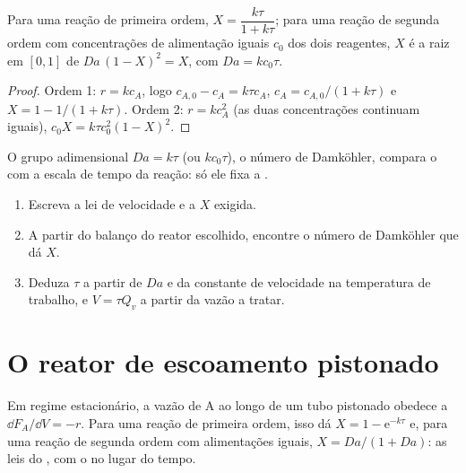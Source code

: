 \begin{theorem}\label{thm:b2:continuous-reactors:cstr}
Para uma reação de primeira ordem, $X = \dfrac{k\tau}{1 + k\tau}$; para uma
reação de segunda ordem com concentrações de alimentação iguais $c_0$ dos dois
reagentes, $X$ é a raiz em $[0, 1]$ de $Da\,(1 - X)^2 = X$, com $Da =
kc_0\tau$.
\end{theorem}

\begin{proof}
Ordem 1: $r = kc_A$, logo $c_{A,0} - c_A = k\tau c_A$, $c_A = c_{A,0}/(1 + k\tau)$
e $X = 1 - 1/(1 + k\tau)$. Ordem 2: $r = kc_A^2$ (as duas concentrações
continuam iguais), $c_0X = k\tau c_0^2(1 - X)^2$.
\end{proof}

O grupo adimensional $Da = k\tau$ (ou $kc_0\tau$), o número de
Damköhler, compara o  com a escala de tempo da reação:
só ele fixa a .

\begin{method}\label{met:b2:continuous-reactors:size-reactor}
\begin{enumerate}
  \item Escreva a lei de velocidade e a  $X$ exigida.
  \item A partir do balanço do reator escolhido, encontre o número de
        Damköhler que dá $X$.
  \item Deduza $\tau$ a partir de $Da$ e da constante de velocidade na
        temperatura de trabalho, e $V = \tau Q_v$ a partir da vazão a tratar.
\end{enumerate}
\end{method}

\section{O reator de escoamento pistonado}

\begin{theorem}\label{thm:b2:continuous-reactors:pfr}
Em regime estacionário, a vazão de A ao longo de um tubo pistonado obedece a
$\dd F_A/\dd V = -r$. Para uma reação de primeira ordem, isso dá $X = 1 -
\mathrm e^{-k\tau}$ e, para uma reação de segunda ordem com alimentações
iguais, $X =
Da/(1 + Da)$: as leis do , com o  no
lugar do tempo.
\end{theorem}

